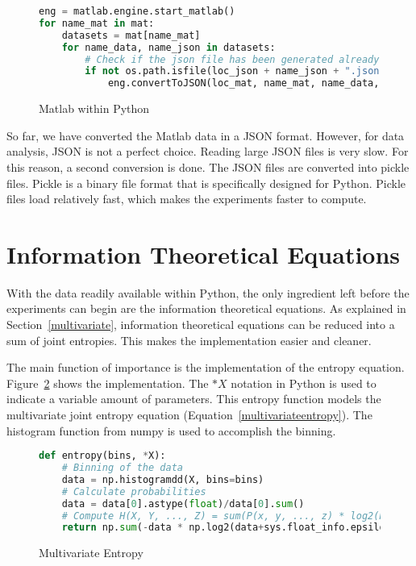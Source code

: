 \begin{figure}[H]
\caption{Matlab within Python}
\label{matlabpython}
\begin{lstlisting}[language=Python]
eng = matlab.engine.start_matlab()
for name_mat in mat:
    datasets = mat[name_mat]
    for name_data, name_json in datasets:
        # Check if the json file has been generated already
        if not os.path.isfile(loc_json + name_json + ".json"):
            eng.convertToJSON(loc_mat, name_mat, name_data, loc_json, name_json, nargout=0)
\end{lstlisting}
\end{figure}

So far, we have converted the Matlab data in a JSON format. However, for data analysis, JSON is not a perfect choice. Reading large JSON files is very slow. For this reason, a second conversion is done. The JSON files are converted into pickle files. Pickle is a binary file format that is specifically designed for Python. Pickle files load relatively fast, which makes the experiments faster to compute.

\section{Information Theoretical Equations}

With the data readily available within Python, the only ingredient left before the experiments can begin are the information theoretical equations. As explained in Section~\ref{multivariate}, information theoretical equations can be reduced into a sum of joint entropies. This makes the implementation easier and cleaner. 

The main function of importance is the implementation of the entropy equation. Figure~\ref{impl:entropy} shows the implementation. The $*X$ notation in Python is used to indicate a variable amount of parameters. This entropy function models the multivariate joint entropy equation (Equation~\ref{multivariateentropy}). The histogram function from numpy is used to accomplish the binning. 

\begin{figure}[H]
\caption{Multivariate Entropy}
\label{impl:entropy}
\begin{lstlisting}[language=Python]
def entropy(bins, *X):
    # Binning of the data
    data = np.histogramdd(X, bins=bins)
    # Calculate probabilities
    data = data[0].astype(float)/data[0].sum()
    # Compute H(X, Y, ..., Z) = sum(P(x, y, ..., z) * log2(P(x, y, ..., z)))
    return np.sum(-data * np.log2(data+sys.float_info.epsilon))
\end{lstlisting}
\end{figure}

